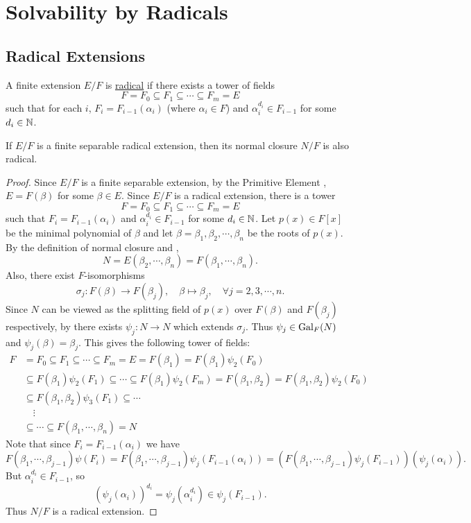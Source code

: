\documentclass[11pt]{article}
\begin{document}
\pagebreak
\section{Solvability by Radicals}

\subsection{Radical Extensions}

\begin{definition}
    A finite extension $E/F$ is \ul{radical} if there exists a tower of fields
    \[F=F_0\subseteq F_1\subseteq\cdots\subseteq F_m=E\]
    such that for each $i$, $F_i=F_{i-1}(\alpha_i)$ (where $\alpha_i\in F$) and $\alpha_i^{d_i}\in F_{i-1}$ for some $d_i\in\mathbb{N}$.
\end{definition}

\begin{lemma}
    If $E/F$ is a finite separable radical extension, then its normal closure $N/F$ is also radical.
\end{lemma}

\begin{proof}
    Since $E/F$ is a finite separable extension, by the Primitive Element , $E=F(\beta)$ for some $\beta\in E$. Since $E/F$ is a radical extension, there is a tower
    \[F=F_0\subseteq F_1\subseteq\cdots\subseteq F_m=E\]
    such that $F_i=F_{i-1}(\alpha_i)$ and $\alpha_i^{d_i}\in F_{i-1}$ for some $d_i\in\mathbb{N}$. Let $p(x)\in F[x]$ be the minimal polynomial of $\beta$ and let $\beta=\beta_1,\beta_2,\cdots,\beta_n$ be the roots of $p(x)$. By the definition of normal closure and ,
    \[N=E(\beta_2,\cdots,\beta_n)=F(\beta_1,\cdots,\beta_n).\]
    Also, there exist $F$-isomorphisms
    \[\sigma_j:F(\beta)\to F(\beta_j),\quad\beta\mapsto\beta_j,\quad\forall j=2,3,\cdots,n.\]
    Since $N$ can be viewed as the splitting field of $p(x)$ over $F(\beta)$ and $F(\beta_j)$ respectively, by  there exists $\psi_j:N\to N$ which extends $\sigma_j$. Thus $\psi_j\in\operatorname{Gal}_F(N)$ and $\psi_j(\beta)=\beta_j$. This gives the following tower of fields:
    \begin{align*}
        F&=F_0\subseteq F_1\subseteq\cdots\subseteq F_m=E=F(\beta_1)=F(\beta_1)\psi_2(F_0) \\
        &\subseteq F(\beta_1)\psi_2(F_1)\subseteq\cdots\subseteq F(\beta_1)\psi_2(F_m)=F(\beta_1,\beta_2)=F(\beta_1,\beta_2)\psi_2(F_0) \\
        &\subseteq F(\beta_1,\beta_2)\psi_3(F_1)\subseteq\cdots \\
        &\quad\vdots \\
        &\subseteq\cdots\subseteq F(\beta_1,\cdots,\beta_n)=N
    \end{align*}
    Note that since $F_i=F_{i-1}(\alpha_i)$ we have
    \[F(\beta_1,\cdots,\beta_{j-1})\psi(F_i)=F(\beta_1,\cdots,\beta_{j-1})\psi_j(F_{i-1}(\alpha_i))=\left(F(\beta_1,\cdots,\beta_{j-1})\psi_j(F_{i-1})\right)(\psi_j(\alpha_i)).\]
    But $\alpha_i^{d_i}\in F_{i-1}$, so
    \[(\psi_j(\alpha_i))^{d_i}=\psi_j(\alpha_i^{d_i})\in\psi_j(F_{i-1}).\]
    Thus $N/F$ is a radical extension.
    
\end{proof}
\end{document}
